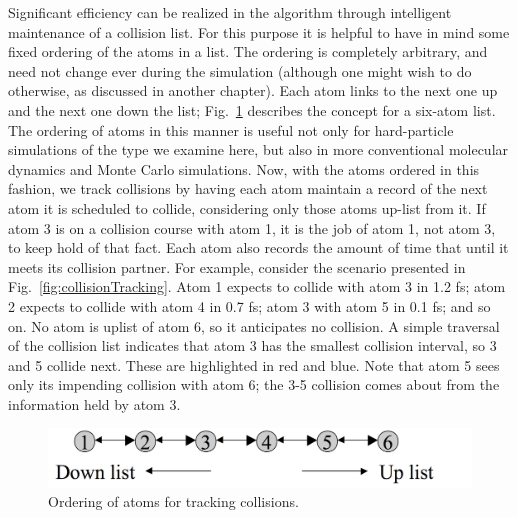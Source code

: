 \documentclass[]{article}
\begin{document}
Significant efficiency can be realized in the algorithm through intelligent
maintenance of a collision list. For this purpose it is helpful to have
in mind some fixed ordering of the atoms in a list. The ordering is
completely arbitrary, and need not change ever during the simulation
(although one might wish to do otherwise, as discussed in another
chapter). Each atom links to the next one up and the next one down the
list; Fig.~\ref{fig:ordering} describes the concept for a six-atom list. The
ordering of atoms in this manner is useful not only for hard-particle
simulations of the type we examine here, but also in more conventional
molecular dynamics and Monte Carlo simulations. Now, with the atoms
ordered in this fashion, we track collisions by having each atom
maintain a record of the next atom it is scheduled to collide,
considering only those atoms up-list from it. If atom 3 is on a
collision course with atom 1, it is the job of atom 1, not atom 3, to
keep hold of that fact. Each atom also records the amount of time that
until it meets its collision partner. For example, consider the scenario
presented in Fig.~\ref{fig:collisionTracking}. Atom 1 expects to collide with atom 3 in 1.2
fs; atom 2 expects to collide with atom 4 in 0.7 fs; atom 3 with atom 5
in 0.1 fs; and so on. No atom is uplist of atom 6, so it anticipates no
collision. A simple traversal of the collision list indicates that atom
3 has the smallest collision interval, so 3 and 5 collide next. These
are highlighted in red and blue.%
Note that atom 5 sees only its impending collision with
atom 6; the 3-5 collision comes about from the information held by atom
3.

\begin{figure}
  \centering
  \includegraphics[width=\textwidth]{HSMD_figures/image040}
  \caption{\label{fig:ordering}Ordering of atoms for tracking collisions.}
\end{figure}
\end{document}
